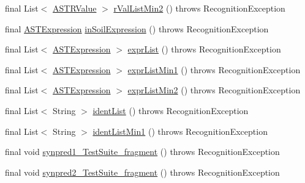 \begin{DoxyCompactItemize}
\item 
final List$<$ \hyperlink{classorg_1_1tzi_1_1use_1_1parser_1_1soil_1_1ast_1_1_a_s_t_r_value}{A\-S\-T\-R\-Value} $>$ \hyperlink{classorg_1_1tzi_1_1use_1_1parser_1_1testsuite_1_1_test_suite_parser_a96c35b340cbdcb190a538ce6adc341f8}{r\-Val\-List\-Min2} ()  throws Recognition\-Exception 
\item 
final \hyperlink{classorg_1_1tzi_1_1use_1_1parser_1_1ocl_1_1_a_s_t_expression}{A\-S\-T\-Expression} \hyperlink{classorg_1_1tzi_1_1use_1_1parser_1_1testsuite_1_1_test_suite_parser_af4b7791963d63c2f2f89134f2390b321}{in\-Soil\-Expression} ()  throws Recognition\-Exception 
\item 
final List$<$ \hyperlink{classorg_1_1tzi_1_1use_1_1parser_1_1ocl_1_1_a_s_t_expression}{A\-S\-T\-Expression} $>$ \hyperlink{classorg_1_1tzi_1_1use_1_1parser_1_1testsuite_1_1_test_suite_parser_a477d1172f7f65b9460fcbb5e2d36c8dd}{expr\-List} ()  throws Recognition\-Exception 
\item 
final List$<$ \hyperlink{classorg_1_1tzi_1_1use_1_1parser_1_1ocl_1_1_a_s_t_expression}{A\-S\-T\-Expression} $>$ \hyperlink{classorg_1_1tzi_1_1use_1_1parser_1_1testsuite_1_1_test_suite_parser_a2467d4fb3f93fd909cf1b2cd0ab40adf}{expr\-List\-Min1} ()  throws Recognition\-Exception 
\item 
final List$<$ \hyperlink{classorg_1_1tzi_1_1use_1_1parser_1_1ocl_1_1_a_s_t_expression}{A\-S\-T\-Expression} $>$ \hyperlink{classorg_1_1tzi_1_1use_1_1parser_1_1testsuite_1_1_test_suite_parser_afbc427c4600da47ad23c65b0e75efef0}{expr\-List\-Min2} ()  throws Recognition\-Exception 
\item 
final List$<$ String $>$ \hyperlink{classorg_1_1tzi_1_1use_1_1parser_1_1testsuite_1_1_test_suite_parser_aea751046c1ed1296b1743de76ee95c38}{ident\-List} ()  throws Recognition\-Exception 
\item 
final List$<$ String $>$ \hyperlink{classorg_1_1tzi_1_1use_1_1parser_1_1testsuite_1_1_test_suite_parser_a2e27511aedb5e8ee34245648a3bfeed0}{ident\-List\-Min1} ()  throws Recognition\-Exception 
\item 
final void \hyperlink{classorg_1_1tzi_1_1use_1_1parser_1_1testsuite_1_1_test_suite_parser_a0807ef329988713824b472f3011cd867}{synpred1\-\_\-\-Test\-Suite\-\_\-fragment} ()  throws Recognition\-Exception 
\item 
final void \hyperlink{classorg_1_1tzi_1_1use_1_1parser_1_1testsuite_1_1_test_suite_parser_a3e79df45b83dc0499f4e8959b26f4bb4}{synpred2\-\_\-\-Test\-Suite\-\_\-fragment} ()  throws Recognition\-Exception 
\item 

\end{DoxyCompactItemize}
